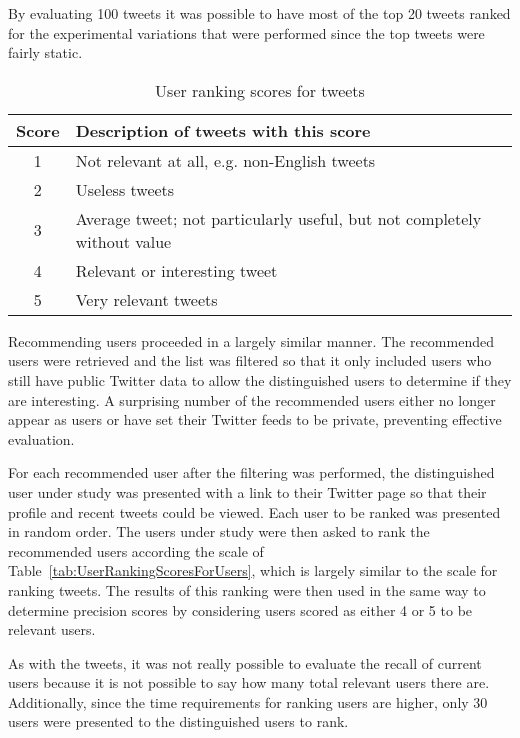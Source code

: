 By evaluating 100 tweets it was possible to have most of the top 20 tweets ranked for the experimental variations that were performed since the top tweets were fairly static.

\begin{table}
\centering
\begin{tabular}{c|l}
{\bf Score} & {\bf Description of tweets with this score} \\ \hline
1 & Not relevant at all, e.g. non-English tweets \\ \hline
2 & Useless tweets \\ \hline
3 & Average tweet; not particularly useful, but not completely without value \\ \hline
4 & Relevant or interesting tweet \\ \hline
5 & Very relevant tweets \\
\end{tabular}
\caption{User ranking scores for tweets}
\label{tab:UserRankingScoresForTweets}
\end{table}


Recommending users proceeded in a largely similar manner. The recommended users were retrieved and the list was filtered so that it only included users who still have public Twitter data to allow the distinguished users to determine if they are interesting. A surprising number of the recommended users either no longer appear as users or have set their Twitter feeds to be private, preventing effective evaluation.

For each recommended user after the filtering was performed, the distinguished user under study was presented with a link to their Twitter page so that their profile and recent tweets could be viewed. Each user to be ranked was presented in random order. The users under study were then asked to rank the recommended users according the scale of Table~\ref{tab:UserRankingScoresForUsers}, which is largely similar to the scale for ranking tweets. The results of this ranking were then used in the same way to determine precision scores by considering users scored as either 4 or 5 to be relevant users.

As with the tweets, it was not really possible to evaluate the recall of current users because it is not possible to say how many total relevant users there are. Additionally, since the time requirements for ranking users are higher, only 30 users were presented to the distinguished users to rank.


